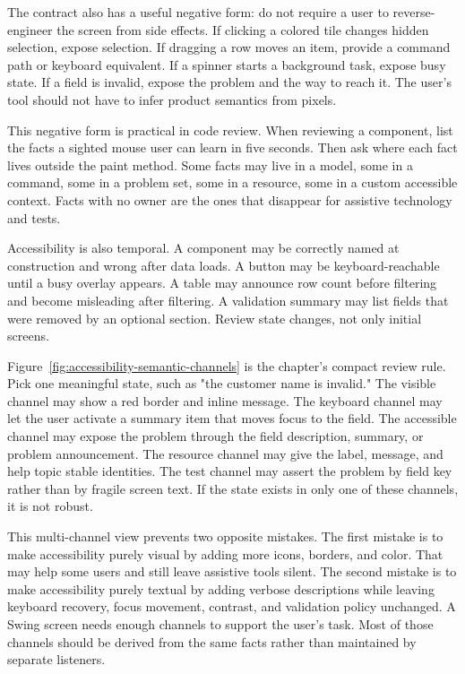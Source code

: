 The contract also has a useful negative form: do not require a user to reverse-engineer the screen from side effects. If clicking a colored tile changes hidden selection, expose selection. If dragging a row moves an item, provide a command path or keyboard equivalent. If a spinner starts a background task, expose busy state. If a field is invalid, expose the problem and the way to reach it. The user's tool should not have to infer product semantics from pixels.

This negative form is practical in code review. When reviewing a component, list the facts a sighted mouse user can learn in five seconds. Then ask where each fact lives outside the paint method. Some facts may live in a model, some in a command, some in a problem set, some in a resource, some in a custom accessible context. Facts with no owner are the ones that disappear for assistive technology and tests.

Accessibility is also temporal. A component may be correctly named at construction and wrong after data loads. A button may be keyboard-reachable until a busy overlay appears. A table may announce row count before filtering and become misleading after filtering. A validation summary may list fields that were removed by an optional section. Review state changes, not only initial screens.

Figure~\ref{fig:accessibility-semantic-channels} is the chapter's compact review
rule. Pick one meaningful state, such as "the customer name is invalid." The
visible channel may show a red border and inline message. The keyboard channel
may let the user activate a summary item that moves focus to the field. The
accessible channel may expose the problem through the field description,
summary, or problem announcement. The resource channel may give the label,
message, and help topic stable identities. The test channel may assert the
problem by field key rather than by fragile screen text. If the state exists in
only one of these channels, it is not robust.

This multi-channel view prevents two opposite mistakes. The first mistake is to
make accessibility purely visual by adding more icons, borders, and color. That
may help some users and still leave assistive tools silent. The second mistake
is to make accessibility purely textual by adding verbose descriptions while
leaving keyboard recovery, focus movement, contrast, and validation policy
unchanged. A Swing screen needs enough channels to support the user's task.
Most of those channels should be derived from the same facts rather than
maintained by separate listeners.

